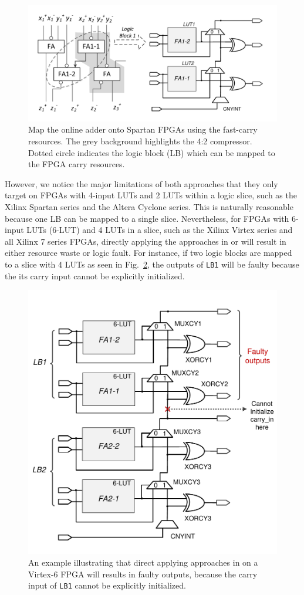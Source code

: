 \documentclass[conference]{IEEEtran}
\begin{document}
\begin{figure}[tbp]
	\centering
	\includegraphics[width=.5\textwidth]{./Figures/SDAdder_42comp_Spartan.pdf}
	\caption{Map the online adder onto Spartan FPGAs using the fast-carry resources. The grey background highlights the 4:2 compressor. Dotted circle indicates the logic block (LB) which can be mapped to the FPGA carry resources.}
	\label{Fig:PreviousWork}
\end{figure}

However, we notice the major limitations of both approaches that they only target on FPGAs with 4-input LUTs and 2 LUTs within a logic slice, such as the Xilinx Spartan series and the Altera Cyclone series. This is naturally reasonable because one LB can be mapped to a single slice. Nevertheless, for FPGAs with 6-input LUTs (6-LUT) and 4 LUTs in a slice, such as the Xilinx Virtex series and all Xilinx 7 series FPGAs, directly applying the approaches in \cite{FPT09RA} or \cite{ASAP09RA} will result in either resource waste or logic fault. For instance, if two logic blocks are mapped to a slice with 4 LUTs as seen in Fig.~\ref{Fig:PreWorkVirtex6}, the outputs of \texttt{LB1} will be faulty because the its carry input cannot be explicitly initialized.

\begin{figure}[tbp]
	\centering
	\includegraphics[width=.45\textwidth]{./Figures/SDadder_FastCarry_PreviousWork.pdf}
	\caption{An example illustrating that direct applying approaches in \cite{FPT09RA} on a Virtex-6 FPGA will results in faulty outputs, because the carry input of \texttt{LB1} cannot be explicitly initialized.}
	\label{Fig:PreWorkVirtex6}
\end{figure}
\end{document}
